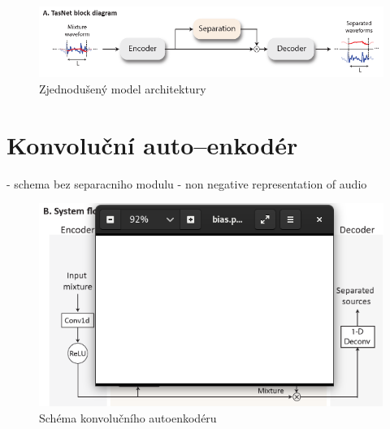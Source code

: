 
\begin{figure}[H]
    \centering
    \includegraphics[scale=0.5]{obrazky-figures/tasnet-pipe.png}
    \caption{\label{fig:tasnet-pipe}Zjednodušený model architektury}
\end{figure}


\section{Konvoluční auto--enkodér}

- schema bez separacniho modulu
- non negative representation of audio
\begin{figure}[H]
    \centering
    \includegraphics[scale=0.5]{obrazky-figures/tasnet-autoencoder.png}
    \caption{\label{fig:tasnet-autoencoder}Schéma konvolučního autoenkodéru}
\end{figure}


